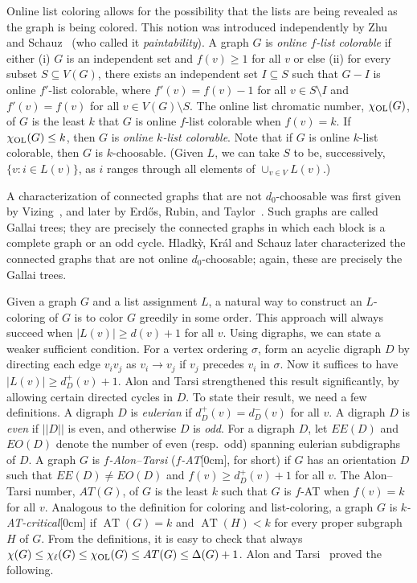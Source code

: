 \documentclass[12pt]{article}
\theoremstyle{plain}
\theoremstyle{definition}
\theoremstyle{remark}
\newcommand{\AT}{\operatorname{AT}}
\def\chil{{\chi_\ell}}
\def\chiol{\chi_{\rm{OL}}}
\newcommand{\aside}[1]{\marginnote{\scriptsize{#1}}[0cm]}
\begin{document}
Online list coloring allows for the possibility that the lists are being
revealed as the graph is being colored.  This notion was introduced 
independently by Zhu~\cite{zhu2009online} and Schauz~\cite{schauz2009mr} (who
called it \emph{paintability}).  A graph $G$ is \emph{online $f$-list
colorable} if either (i) $G$ is an independent
set and $f(v)\ge 1$ for all $v$ or else (ii) for every subset $S\subseteq V(G)$,
there exists an independent set $I\subseteq S$ such that $G-I$ is online
$f'$-list colorable, where $f'(v)=f(v)-1$ for all $v\in S\setminus I$ and
$f'(v)=f(v)$ for all $v\in V(G)\setminus S$.  The online list chromatic number, 
$\chiol(G)$, of $G$ is the least $k$ that $G$ is online $f$-list colorable when
$f(v)=k$.  If $\chiol(G)\le k$, then $G$ is \emph{online $k$-list colorable}.
Note that if $G$ is online $k$-list colorable, then $G$ is
$k$-choosable. (Given $L$, we can take $S$ to be, successively, 
$\{v:i\in L(v)\}$, as $i$ ranges through all elements of $\cup_{v\in V}L(v)$.)

A characterization of connected graphs that are not $d_0$-choosable was first
given by Vizing~\cite{vizing1976}, and later by Erd\H{o}s, Rubin, and
Taylor~\cite{erdos1979choosability}.  Such graphs are called Gallai trees;
they are precisely the connected graphs in which each block is a complete graph
or an odd cycle.  Hladk{\`y}, Kr{\'a}l and Schauz later characterized the connected
graphs that are not online $d_0$-choosable; again, these are precisely the
Gallai trees.

Given a graph $G$ and a list assignment $L$, a natural way to construct an
$L$-coloring of $G$ is to color $G$ greedily in some order.  This approach will
always succeed when $|L(v)|\ge d(v)+1$ for all $v$.  Using digraphs, we can
state a weaker sufficient condition.  For a vertex ordering $\sigma$, form an
acyclic digraph $D$ by directing each edge $v_iv_j$ as $v_i \to v_j$ if $v_j$
precedes $v_i$ in $\sigma$.  Now it suffices to have $|L(v)|\ge d^+_D(v)+1$. 
Alon and Tarsi strengthened this result significantly, by
allowing certain directed cycles in $D$.  To state their result, we need a few
definitions.  A digraph $D$ is \emph{eulerian} if $d^+_D(v)=d^-_D(v)$ for all
$v$.  A digraph $D$ is \emph{even} if $||D||$ is even, and otherwise $D$ is
\emph{odd}.  For a digraph $D$, let $EE(D)$ and $EO(D)$ denote the number of
even (resp.~odd) spanning eulerian subdigraphs of $D$.  A graph $G$ is
\emph{$f$-Alon--Tarsi} (\emph{$f$-AT}\aside{$f$-AT}, for short) if $G$ has an
orientation $D$ such that $EE(D)\ne EO(D)$ and $f(v)\ge d^+_D(v)+1$ for all
$v$.  The Alon--Tarsi number, $AT(G)$, of $G$ is the least $k$ such that $G$ is
$f$-AT when $f(v)=k$ for all $v$.  Analogous to the definition for coloring and
list-coloring, a graph $G$ is \emph{$k$-AT-critical}\aside{$k$-AT-critical} if
$\AT(G)=k$ and $\AT(H)<k$ for every proper subgraph $H$ of $G$.  From the
definitions, it is easy to check that always $\chi(G)\le \chil(G)\le
\chiol(G)\le AT(G)\le \Delta(G)+1$.
Alon and Tarsi~\cite{Alon1992125} proved the following.
 
\end{document}
